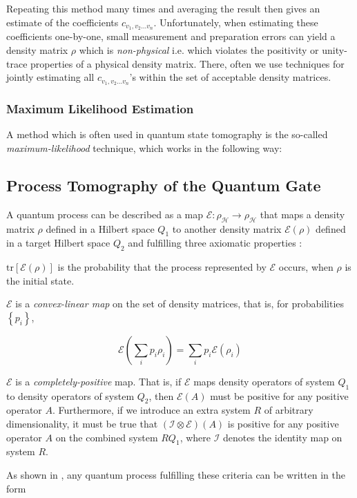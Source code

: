 Repeating this method many times and averaging the result then gives an estimate of the coefficients $c_{v_1,v_2\hdots v_n}$. Unfortunately, when estimating these coefficients one-by-one, small measurement and preparation errors can yield a density matrix $\rho$ which is {\it non-physical} i.e. which violates the positivity or unity-trace properties of a physical density matrix. There, often we use techniques for jointly estimating all $c_{v_1,v_2\hdots v_n}$'s within the set of acceptable density matrices.

\subsubsection{Maximum Likelihood Estimation}

A method which is often used in quantum state tomography is the so-called {\it maximum-likelihood} technique, which works in the following way:

\subsection{Process Tomography of the Quantum Gate}

A quantum process can be described as a map $\mathcal{E} : \rho_\mathcal{H} \to \rho_\mathcal{H}$ that maps a density matrix $\rho$ defined in a Hilbert space $Q_1$ to another density matrix $\mathcal{E}(\rho)$ defined in a target Hilbert space $Q_2$ and fulfilling three axiomatic properties \cite{michael_a._nielsen_quantum_2000,haroche_exploring_2006}:

\begin{axiom}
$\mathrm{tr}\left[\mathcal{E}(\rho)\right]$ is the probability that the process represented by $\mathcal{E}$ occurs, when $\rho$ is the initial state.
\end{axiom}

\begin{axiom}
$\mathcal{E}$ is a {\it convex-linear map} on the set of density matrices, that is, for probabilities $\left\{p_i\right\}$,

  \begin{equation}
	  \mathcal{E}\left(\sum\limits_i p_i \rho_i\right) = \sum\limits_i p_i \mathcal{E}(\rho_i)
	\end{equation}
\end{axiom}

\begin{axiom}
$\mathcal{E}$ is a {\it completely-positive} map. That is, if $\mathcal{E}$  maps density operators of system $Q_1$ to density operators of system $Q_2$, then $\mathcal{E}(A)$ must be positive for any positive operator $A$. Furthermore, if we introduce an extra system $R$ of arbitrary dimensionality, it must be true that $(\mathcal{I}\otimes \mathcal{E})(A)$ is positive for any positive operator $A$ on the combined system $RQ_1$, where $\mathcal{I}$ denotes the identity map on system $R$.
\end{axiom}
As shown in \cite{michael_a._nielsen_quantum_2000}, any quantum process fulfilling these criteria can be written in the form

